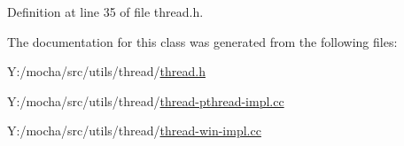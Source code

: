 Definition at line 35 of file thread.h.



The documentation for this class was generated from the following files:\begin{DoxyCompactItemize}
\item 
Y:/mocha/src/utils/thread/\hyperlink{thread_8h}{thread.h}\item 
Y:/mocha/src/utils/thread/\hyperlink{thread-pthread-impl_8cc}{thread-\/pthread-\/impl.cc}\item 
Y:/mocha/src/utils/thread/\hyperlink{thread-win-impl_8cc}{thread-\/win-\/impl.cc}\end{DoxyCompactItemize}
